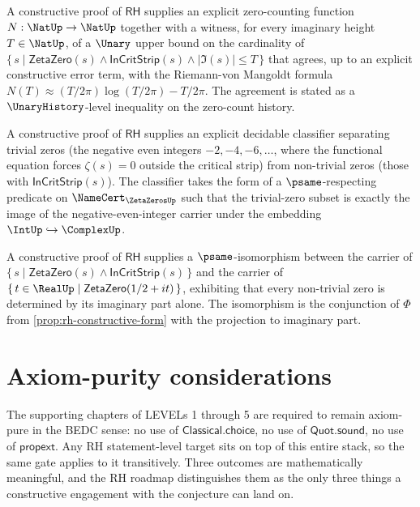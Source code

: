 \begin{theorem}
\label{thm:rh-witness-zero-count}
A constructive proof of $\mathsf{RH}$ supplies an explicit zero-counting function $N : \NatUp \to \NatUp$ together with a witness, for every imaginary height $T \in \NatUp$, of a $\Unary$ upper bound on the cardinality of $\{\, s \mid \mathsf{ZetaZero}(s) \wedge \mathsf{InCritStrip}(s) \wedge |\Im(s)| \le T \,\}$ that agrees, up to an explicit constructive error term, with the Riemann-von Mangoldt formula $N(T) \approx (T / 2\pi) \log(T / 2\pi) - T / 2\pi$. The agreement is stated as a $\UnaryHistory$-level inequality on the zero-count history.
\end{theorem}

\begin{theorem}
\label{thm:rh-witness-trivial-zero}
A constructive proof of $\mathsf{RH}$ supplies an explicit decidable classifier separating trivial zeros (the negative even integers $-2, -4, -6, \dots$, where the functional equation forces $\zeta(s) = 0$ outside the critical strip) from non-trivial zeros (those with $\mathsf{InCritStrip}(s)$). The classifier takes the form of a $\psame$-respecting predicate on $\NameCert_{\ZetaZerosUp}$ such that the trivial-zero subset is exactly the image of the negative-even-integer carrier under the embedding $\IntUp \hookrightarrow \ComplexUp$.
\end{theorem}

\begin{theorem}
\label{thm:rh-witness-critical-line-restriction}
A constructive proof of $\mathsf{RH}$ supplies a $\psame$-isomorphism between the carrier of $\{\, s \mid \mathsf{ZetaZero}(s) \wedge \mathsf{InCritStrip}(s) \,\}$ and the carrier of $\{\, t \in \RealUp \mid \mathsf{ZetaZero}(1/2 + it) \,\}$, exhibiting that every non-trivial zero is determined by its imaginary part alone. The isomorphism is the conjunction of $\Phi$ from \autoref{prop:rh-constructive-form} with the projection to imaginary part.
\end{theorem}

\section{Axiom-purity considerations}
\label{sec:rh-axiom-purity}

The supporting chapters of LEVELs 1 through 5 are required to remain axiom-pure in the BEDC sense: no use of $\mathsf{Classical.choice}$, no use of $\mathsf{Quot.sound}$, no use of $\mathsf{propext}$. Any RH statement-level target sits on top of this entire stack, so the same gate applies to it transitively. Three outcomes are mathematically meaningful, and the RH roadmap distinguishes them as the only three things a constructive engagement with the conjecture can land on.

